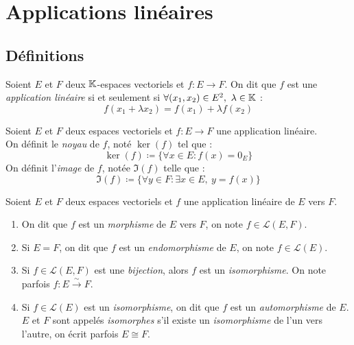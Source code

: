 \chapter{Applications linéaires}

\section{Définitions}
\begin{definition}
    Soient $E$ et $F$ deux $\mathbb{K}$-espaces vectoriels et $f : E \to F$.
    On dit que $f$ est une \emph{application linéaire} si et seulement si $\forall (x_1, x_2) \in E^2,\ \lambda \in \mathbb{K}$ :
    \[ f(x_1 + \lambda x_2) = f(x_1) + \lambda f(x_2) \]
\end{definition}

\begin{definition}
    Soient $E$ et $F$ deux espaces vectoriels et $f : E \to F$ une application linéaire.
    \\
    On définit le \emph{noyau} de $f$, noté $\ker(f)$ tel que :
    \[ \ker(f) \coloneqq \{ \forall x \in E : f(x) = 0_E \} \] 
    On définit l'\emph{image} de $f$, notée $\Im(f)$ telle que :
    \[ \Im(f) \coloneqq \{ \forall y \in F : \exists x \in E,\ y = f(x) \} \]
\end{definition}

\begin{definition}
    \par \noindent Soient $E$ et $F$ deux espaces vectoriels et $f$ une application linéaire de $E$ vers $F$.
    \begin{enumerate}
        \item On dit que $f$ est un \emph{morphisme} de $E$ vers $F$, on note $f \in \mathcal{L}(E, F)$.
        \item Si $E = F$, on dit que $f$ est un \emph{endomorphisme} de $E$, on note $f \in \mathcal{L}(E)$.
        \item Si $f \in \mathcal{L}(E, F)$ est une \emph{bijection}, alors $f$ est un \emph{isomorphisme}. On note parfois $f : E \overset{\sim}{\to} F$.
        \item Si $f \in \mathcal{L}(E)$ est un \emph{isomorphisme}, on dit que $f$ est un \emph{automorphisme} de $E$.
        \\
        $E$ et $F$ sont appelés \emph{isomorphes} s'il existe un \emph{isomorphisme} de l'un vers l'autre, on écrit parfois $E \cong F$.
    \end{enumerate}
\end{definition}

